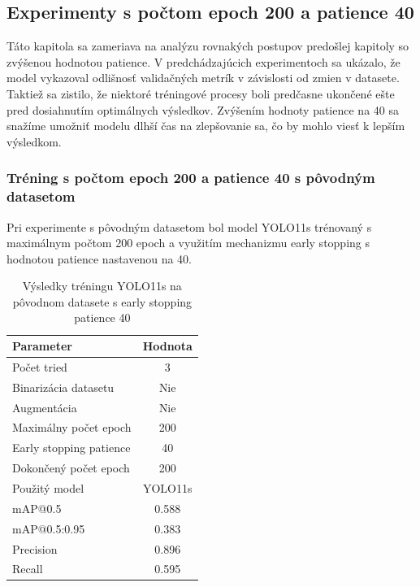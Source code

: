             \subsection{Experimenty s počtom epoch 200 a patience 40}

                Táto kapitola sa zameriava na analýzu rovnakých postupov predošlej kapitoly so zvýšenou hodnotou patience. V predchádzajúcich experimentoch sa ukázalo, že model vykazoval odlišnosť validačných metrík v závislosti od zmien v datasete. Taktiež sa zistilo, že niektoré tréningové procesy boli predčasne ukončené ešte pred dosiahnutím optimálnych výsledkov. Zvýšením hodnoty patience na 40 sa snažíme umožniť modelu dlhší čas na zlepšovanie sa, čo by mohlo viesť k lepším výsledkom.

                \subsubsection{Tréning s počtom epoch 200 a patience 40 s pôvodným datasetom}

                Pri experimente s pôvodným datasetom bol model YOLO11s trénovaný s maximálnym počtom 200 epoch a využitím mechanizmu early stopping s hodnotou patience nastavenou na 40.

                \begin{table}[H]
                    \centering
                    \begin{tabular}{|l|c|}
                    \hline
                    \textbf{Parameter} & \textbf{Hodnota} \\ \hline
                    Počet tried & 3 \\ \hline
                    Binarizácia datasetu & Nie \\ \hline
                    Augmentácia & Nie \\ \hline
                    Maximálny počet epoch & 200 \\ \hline
                    Early stopping patience & 40 \\ \hline
                    Dokončený počet epoch & 200 \\ \hline
                    Použitý model & YOLO11s \\ \hline
                    mAP@0.5 & 0.588 \\ \hline
                    mAP@0.5:0.95 & 0.383 \\ \hline
                    Precision & 0.896 \\ \hline
                    Recall & 0.595 \\ \hline
                    \end{tabular}
                    \caption{Výsledky tréningu YOLO11s na pôvodnom datasete s early stopping patience 40}
                    \label{tab:yolo11s_default_earlystop_p40}
                \end{table}

